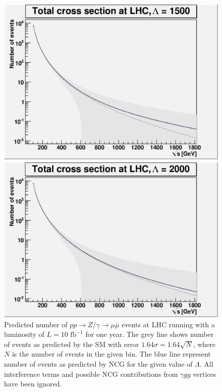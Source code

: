 \begin{figure}[h!tp]
\begin{minipage}[b]{0.475\linewidth}
	  \includegraphics[scale=0.35]{./images/L1500r139.eps}
	\end{minipage}
	\begin{minipage}[b]{0.475\linewidth}
    \centering
	  \includegraphics[scale=0.35]{./images/L2000r139.eps}
	\end{minipage}
		\caption{Predicted number of $pp \rightarrow Z/ \gamma \rightarrow \mu \bar \mu$ events at LHC running with a luminosity of $L=10 \textrm{ fb}^{-1}$ for one year. The grey line shows number of events as predicted by the SM with error $1.64\sigma = 1.64\sqrt{N}$, where $N$ is the number of events in the given bin. The blue line represent number of events as predicted by NCG for the given value of $\Lambda$. All interference terms and possible NCG contributions from $\gamma gg$ vertices have been ignored.} \label{fig:lambdaplot}
\end{figure}
